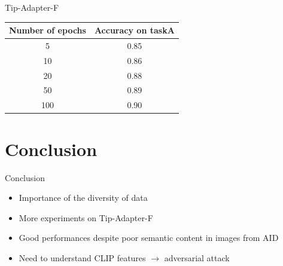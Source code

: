 \documentclass[11pt,compress]{beamer} %
\begin{document}
\begin{frame}{Tip-Adapter-F}
  \begin{table}[H]
    \centering
    \begin{tabular}{|c|c|}
    \hline
    \textbf{Number of epochs} & \textbf{Accuracy on taskA} \\ \hline
    5   & 0.85 \\ \hline
    10  & 0.86 \\ \hline
    20  & 0.88 \\ \hline
    50  & 0.89 \\ \hline
    100 & 0.90 \\ \hline
    \end{tabular}
  \end{table}
\end{frame}

\section{Conclusion}
\begin{frame}{Conclusion}
  \begin{itemize}
    \pause
    \item Importance of the diversity of data
    \pause
    \item More experiments on Tip-Adapter-F
    \pause
    \item Good performances despite poor semantic content in images from AID
    \pause
    \item Need to understand CLIP features $\rightarrow$ adversarial attack
  \end{itemize}
\end{frame}
\end{document}
